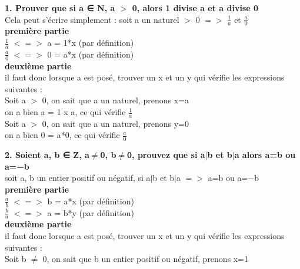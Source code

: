 \newpage
\textbf{1. Prouver que si a ∈ N, a $>$ 0, alors 1 divise a et a divise 0} \\

Cela peut s'écrire simplement : soit a un naturel $>$ 0 $=>$ $\frac{1}{a}$ et $\frac{a}{0}$ \\

\textbf{première partie} \\

$\frac{1}{a}$ $<=>$  a = 1*x (par définition) \\

$\frac{a}{0}$ $<=>$  0 = a*x (par définition) \\

\textbf{deuxième partie} \\

il faut donc lorsque a est posé, trouver un x et un y qui vérifie les expressions suivantes : \\

Soit a $>$ 0, on sait que a un naturel, prenons x=a \\
on a bien a = 1 x a, ce qui vérifie $\frac{1}{a}$ \\

Soit a $>$ 0, on sait que a un naturel, prenons y=0 \\
on a bien 0 = a*0, ce qui vérifie $\frac{a}{0}$

\vspace{10mm}
\textbf{2. Soient a, b ∈ Z, a$\ne$0, b$\ne$0, prouvez que si a$|$b et b$|$a alors a=b ou a=−b} \\

soit a, b un entier positif ou négatif, si a$|$b et b$|$a $=>$ a=b ou a=−b \\

\textbf{première partie} \\

$\frac{a}{b}$ $<=>$  b = a*x (par définition) \\

$\frac{b}{a}$ $<=>$  a = b*y (par définition) \\

\textbf{deuxième partie} \\

il faut donc lorsque a est posé, trouver un x et un y qui vérifie les expressions suivantes : \\

Soit b $\ne$ 0, on sait que b un entier positif ou négatif, prenons x=1 \\

